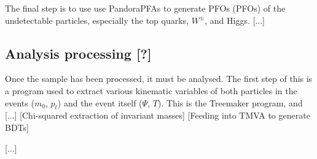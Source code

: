 The final step is to use use PandoraPFAs to generate \acrlong{PFO}s (\acrshort{PFO}s) of the undetectable particles, especially the top quarks, $W^\pm$, and Higgs. [...]

\subsection{Analysis processing [?]}
Once the sample has been processed, it must be analysed. The first step of this is a program used to extract various kinematic variables of both particles in the events ($m_0$, $p_t$) and the event itself ($\Psi$, $T$). This is the Treemaker program, and [...] [Chi-squared extraction of invariant masses] [Feeding into \acrshort{TMVA} to generate \acrshort{BDT}s]

[...]




